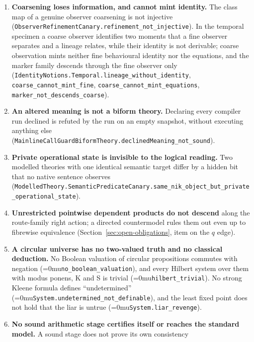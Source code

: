 \documentclass[11pt]{article}
\newcommand{\leanname}[1]{\textup{\Urlmuskip=0mu\relax\nolinkurl{#1}}}
\theoremstyle{definition}
\theoremstyle{remark}
\begin{document}
\begin{enumerate}
  certificate type is a point preserves theorem existence but cannot be
  fibrewise equivalent to a calculus with two distinct proofs of one theorem
  (\nolinkurl{BiformCertificateBoundary.no_unit_certificate_equivalence_for_tagged_theorem}).
\item \textbf{Coarsening loses information, and cannot mint identity.}  The
  class map of a genuine observer coarsening is not injective
  (\nolinkurl{ObserverRefinementCanary.refinement_not_injective}).  In the
  temporal specimen a coarse observer identifies two moments that a fine
  observer separates and a lineage relates, while their identity is not
  derivable; coarse observation mints neither fine behavioural identity nor
  the equations, and the marker family descends through the fine observer
  only (\nolinkurl{IdentityNotions.Temporal.lineage_without_identity},
  \nolinkurl{coarse_cannot_mint_fine}, \nolinkurl{coarse_cannot_mint_equations},
  \nolinkurl{marker_not_descends_coarse}).
\item \textbf{An altered meaning is not a biform theory.}  Declaring every
  compiler run declined is refuted by the run on an empty snapshot, without
  executing anything else
  (\nolinkurl{MainlineCallGuardBiformTheory.declinedMeaning_not_sound}).
\item \textbf{Private operational state is invisible to the logical reading.}
  Two modelled theories with one identical semantic target differ by a
  hidden bit that no native sentence observes
  (\nolinkurl{ModelledTheory.SemanticPredicateCanary.same_nik_object_but_private_operational_state}).
\item \textbf{Unrestricted pointwise dependent products do not descend}
  along the route-family right action; a directed countermodel rules them out
  even up to fibrewise equivalence (Section~\ref{sec:open-obligations}, item
  on the $q$ edge).
\item \textbf{A circular universe has no two-valued truth and no classical
  deduction.}  No Boolean valuation of circular propositions commutes with
  negation (\leanname{no_boolean_valuation}), and every Hilbert system over them
  with modus ponens, K and S is trivial (\leanname{hilbert_trivial}).  No strong
  Kleene formula defines ``undetermined''
  (\leanname{System.undetermined_not_definable}), and the least fixed point does
  not hold that the liar is untrue (\leanname{System.liar_revenge}).
\item \textbf{No sound arithmetic stage certifies itself or reaches the standard
  model.}  A sound stage does not prove its own consistency

\end{enumerate}
\end{document}
